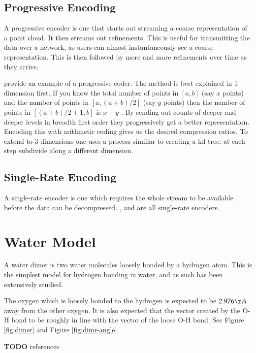 \documentclass{report}
\begin{document}
\subsection{Progressive Encoding}

A progressive encoder is one that starts out streaming a coarse representation
of a point cloud. It then streams out refinements. This is useful for
transmitting the data over a network, as users can almost instantaneously see
a coarse representation. This is then followed by more and more refinements
over time as they arrive.

\citet{devillers2000gci} provide an example of a progressive coder. The method
is best explained in 1 dimension first. If you know the total number of points
in $[a, b]$ (say $x$ points) and the number of points in $[a, (a+b)/2]$ (say
$y$ points) then the number of points in $[(a+b)/2+1, b]$ is $x - y$ . By
sending out counts of deeper and deeper levels in breadth first order they
progressively get a better representation. Encoding this with arithmetic
coding gives us the desired compression ratios. To extend to 3 dimensions one
uses a process similiar to creating a kd-tree: at each step subdivide along a
different dimension.


\subsection{Single-Rate Encoding}

A single-rate encoder is one which requires the whole stream to be available
before the data can be decompressed. \citet{omeltchenko2000sls},
\citet{gumholdcomp} and \citet{merrycomp} are all single-rate encoders.


\section{Water Model}

A water dimer is two water molecules loosely bonded by a hydrogen atom. This
is the simplest model for hydrogen bonding in water, and as such has been
extensively studied.

The oxygen which is loosely bonded to the hydrogen is expected to be
$2.976\AA$ away from the other oxygen. It is also expected that the vector
created by the O-H bond to be roughly in line with the vector of the loose O-H
bond. See Figure \ref{fig:dimer} and Figure \ref{fig:dimr-angle}.

\textbf{TODO} references
\end{document}

